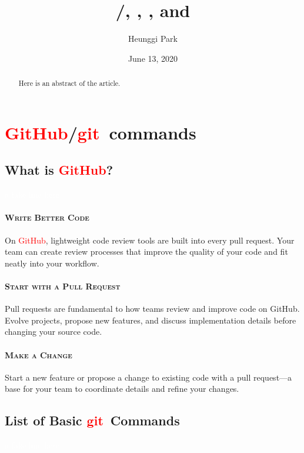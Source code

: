 \documentclass{amsart}
\title{\github/\git, \html, \css, and \javascript}
\author{Heunggi Park}
\date{June 13, 2020}
\newcommand{\git}{\textcolor{red}{{\ttfamily git}}}
\newcommand{\github}{\textcolor{red}{{\ttfamily GitHub}}}
\newcommand{\html}{\textcolor{red}{{\ttfamily html}}}
\newcommand{\css}{\textcolor{blue}{{\ttfamily CSS}}}
\newcommand{\javascript}{\textcolor{blue}{{\ttfamily JavaScript}}}
\newcommand{\newpara}[1]{\par\vspace{0.5em}\paragraph{\scshape#1}}
\newcommand{\afakeline}{\textcolor{white}{a fake line here}}
\begin{document}
\maketitle

\begin{abstract}
	Here is an abstract of the article.
\end{abstract}

\section{\github/\git\ commands}

\subsection{What is \github?}\afakeline\par\vspace{0.5em}\noindent

\newpara{Write Better Code}
On \github, lightweight code review tools are built into every pull request. Your team can create review processes that improve the quality of your code and fit neatly into your workflow.

\newpara{Start with a Pull Request}
Pull requests are fundamental to how teams review and improve code on GitHub. Evolve projects, propose new features, and discuss implementation details before changing your source code.

\newpara{Make a Change}
Start a new feature or propose a change to existing code with a pull request—a base for your team to coordinate details and refine your changes.


\subsection{List of Basic \git\ Commands}\afakeline%
\end{document}
